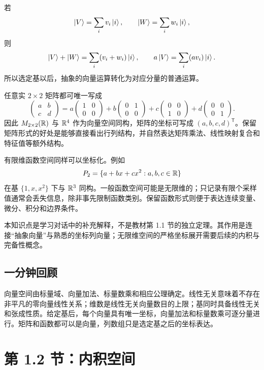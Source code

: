 若
\[
  \left|V\right\rangle=\sum_i v_i\left|i\right\rangle,\qquad
  \left|W\right\rangle=\sum_i w_i\left|i\right\rangle,
\]
则
\[
  \left|V\right\rangle+\left|W\right\rangle=\sum_i(v_i+w_i)\left|i\right\rangle,\qquad
  a\left|V\right\rangle=\sum_i(av_i)\left|i\right\rangle.
\]
所以选定基以后，抽象的向量运算转化为对应分量的普通运算。


任意实 $2\times2$ 矩阵都可唯一写成
\[
  \begin{pmatrix}a&b\\c&d\end{pmatrix}
  =a\begin{pmatrix}1&0\\0&0\end{pmatrix}
  +b\begin{pmatrix}0&1\\0&0\end{pmatrix}
  +c\begin{pmatrix}0&0\\1&0\end{pmatrix}
  +d\begin{pmatrix}0&0\\0&1\end{pmatrix}.
\]
因此 $M_{2\times2}(\mathbb{R})$ 与 $\mathbb{R}^4$ 作为向量空间同构，矩阵的坐标可写成 $(a,b,c,d)^{\mathsf T}$。保留矩阵形式的好处是能够直接看出行列结构，并自然表达矩阵乘法、线性映射复合和特征值等额外结构。

有限维函数空间同样可以坐标化。例如
\[
  P_2=\{a+bx+cx^2:a,b,c\in\mathbb{R}\}
\]
在基 $\{1,x,x^2\}$ 下与 $\mathbb{R}^3$ 同构。一般函数空间可能是无限维的；只记录有限个采样值通常会丢失信息，除非事先限制函数类别。保留函数形式则便于表达连续变量、微分、积分和边界条件。

\begin{remark}
本知识点是学习对话中的补充解释，不是教材第 1.1 节的独立定理。其作用是连接“抽象向量”与熟悉的坐标列向量；无限维空间的严格坐标展开需要后续的内积与完备性概念。
\end{remark}

\subsection{一分钟回顾}

向量空间由标量域、向量加法、标量数乘和相应公理确定。线性无关意味着不存在非平凡的零向量线性关系；维数是线性无关向量数目的上限；基同时具备线性无关和张成性质。给定基后，每个向量具有唯一坐标，向量加法和标量数乘可逐分量进行。矩阵和函数都可以是向量，列数组只是选定基之后的坐标表达。

\section{第 1.2 节：内积空间}
\label{section:QM-C01-S02}

